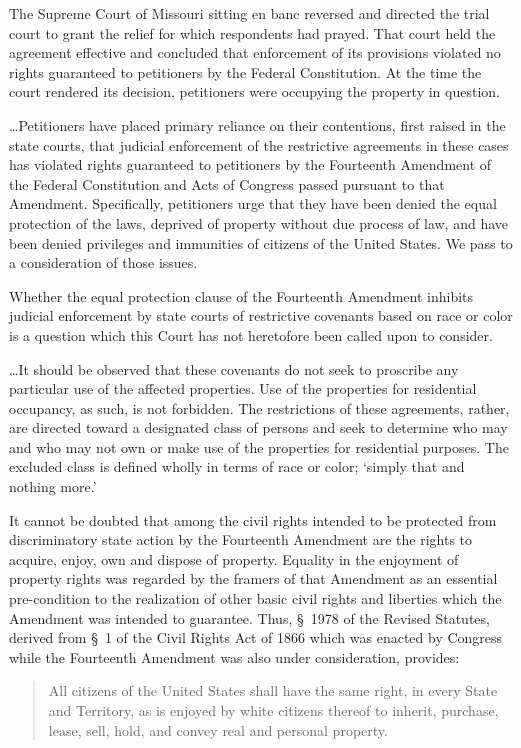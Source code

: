 The Supreme Court of Missouri sitting en banc reversed and directed the trial
court to grant the relief for which respondents had prayed. That court held the
agreement effective and concluded that enforcement of its provisions violated no
rights guaranteed to petitioners by the Federal Constitution. At the time the
court rendered its decision, petitioners were occupying the property in
question.

\ldots Petitioners have placed primary reliance on their contentions, first
raised in the state courts, that judicial enforcement of the restrictive
agreements in these cases has violated rights guaranteed to petitioners by the
Fourteenth Amendment of the Federal Constitution and Acts of Congress passed
pursuant to that Amendment. Specifically, petitioners urge that they have been
denied the equal protection of the laws, deprived of property without due
process of law, and have been denied privileges and immunities of citizens of
the United States. We pass to a consideration of those issues.


Whether the equal protection clause of the Fourteenth Amendment inhibits
judicial enforcement by state courts of restrictive covenants based on race or
color is a question which this Court has not heretofore been called upon to
consider.

\ldots It should be observed that these covenants do not seek to proscribe any
particular use of the affected properties. Use of the properties for residential
occupancy, as such, is not forbidden. The restrictions of these agreements,
rather, are directed toward a designated class of persons and seek to determine
who may and who may not own or make use of the properties for residential
purposes. The excluded class is defined wholly in terms of race or color;
`simply that and nothing more.'

It cannot be doubted that among the civil rights intended to be protected from
discriminatory state action by the Fourteenth Amendment are the rights to
acquire, enjoy, own and dispose of property. Equality in the enjoyment of
property rights was regarded by the framers of that Amendment as an essential
pre-condition to the realization of other basic civil rights and liberties which
the Amendment was intended to guarantee. Thus, \S~1978 of the Revised Statutes,
derived from \S~1 of the Civil Rights Act of 1866 which was enacted by Congress
while the Fourteenth Amendment was also under consideration, provides:
\begin{quote}
All citizens of the United States shall have the same right, in every State
and Territory, as is enjoyed by white citizens thereof to inherit, purchase,
lease, sell, hold, and convey real and personal property.
\end{quote}

